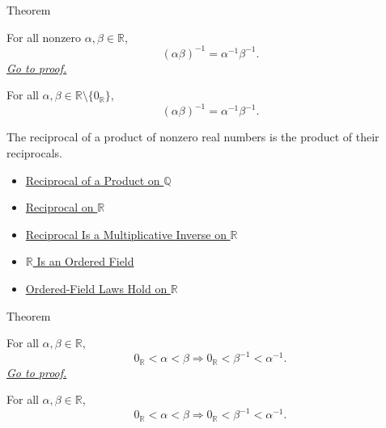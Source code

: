 \begin{theorembox}{Theorem}
\begin{theorem}
\label{thm:reciprocal-of-product-on-r}
For all nonzero $\alpha,\beta\in\mathbb{R}$,
\[
(\alpha\beta)^{-1}=\alpha^{-1}\beta^{-1}.
\]
\hyperref[prf:reciprocal-of-product-on-r]{\textit{Go to proof.}}
\end{theorem}
\end{theorembox}

\begin{remark*}
For all $\alpha,\beta\in\mathbb{R}\setminus\{0_{\mathbb{R}}\}$,
\[
(\alpha\beta)^{-1}=\alpha^{-1}\beta^{-1}.
\]
\end{remark*}

\begin{remark*}[Interpretation]
The reciprocal of a product of nonzero real numbers is the product of their
reciprocals.
\end{remark*}

\begin{dependencies}
\begin{itemize}
  \item \hyperref[thm:reciprocal-of-product-on-q]{Reciprocal of a Product on $\mathbb{Q}$}
  \item \hyperref[def:reciprocal-on-r]{Reciprocal on $\mathbb{R}$}
  \item \hyperref[thm:reciprocal-multiplicative-inverse-on-r]{Reciprocal Is a Multiplicative Inverse on $\mathbb{R}$}
  \item \hyperref[thm:r-is-an-ordered-field]{$\mathbb{R}$ Is an Ordered Field}
  \item \hyperref[cor:ordered-field-laws-on-r]{Ordered-Field Laws Hold on $\mathbb{R}$}
\end{itemize}
\end{dependencies}

\begin{theorembox}{Theorem}
\begin{theorem}
\label{thm:reciprocal-reverses-order-on-positives-r}
For all $\alpha,\beta\in\mathbb{R}$,
\[
0_{\mathbb{R}}<\alpha<\beta
\Longrightarrow
0_{\mathbb{R}}<\beta^{-1}<\alpha^{-1}.
\]
\hyperref[prf:reciprocal-reverses-order-on-positives-r]{\textit{Go to proof.}}
\end{theorem}
\end{theorembox}

\begin{remark*}
For all $\alpha,\beta\in\mathbb{R}$,
\[
0_{\mathbb{R}}<\alpha<\beta
\Longrightarrow
0_{\mathbb{R}}<\beta^{-1}<\alpha^{-1}.
\]
\end{remark*}

